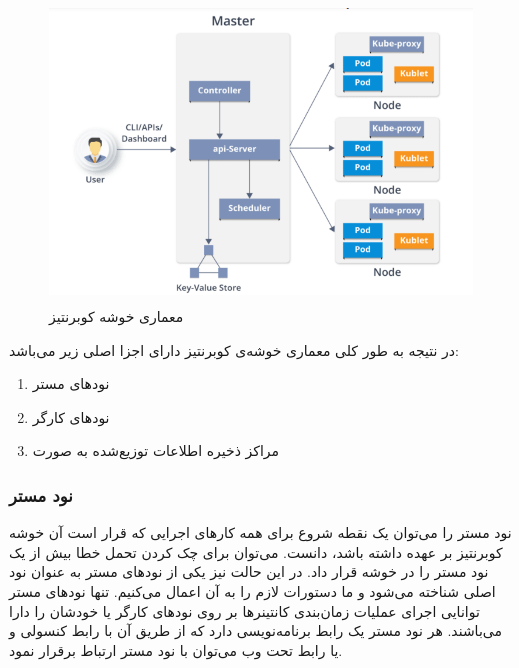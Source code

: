 \begin{figure}[!h]
	\centering
	\includegraphics[height=8cm]{images/kubernetes-cluster}
	\caption{معماری خوشه کوبرنتیز}
	\label{تصویر 2-10}
\end{figure}

در نتیجه به طور کلی معماری خوشه‌ی کوبرنتیز دارای اجزا اصلی زیر می‌باشد:

\begin{enumerate}
	\item نودهای مستر
	\item	 نود‌های کارگر
	\item مراکز ذخیره اطلاعات توزیع‌شده به صورت 
\end{enumerate}


\subsubsection*{نود مستر}
نود مستر را می‌توان یک نقطه شروع برای همه کارهای اجرایی که قرار است آن خوشه کوبرنتیز بر عهده داشته باشد، دانست. می‌توان برای چک کردن تحمل خطا بیش از یک نود مستر را در خوشه قرار داد. در این حالت نیز یکی از نودهای مستر به عنوان نود اصلی شناخته می‌شود و ما دستورات لازم را به آن اعمال می‌کنیم. تنها نود‌های مستر توانایی اجرای عملیات زمان‌بندی کانتینرها بر روی نود‌های کارگر یا خودشان را دارا می‌باشند. هر نود مستر یک رابط برنامه‌نویسی دارد که از طریق آن با رابط کنسولی و یا رابط تحت وب می‌توان با نود مستر ارتباط برقرار نمود.

